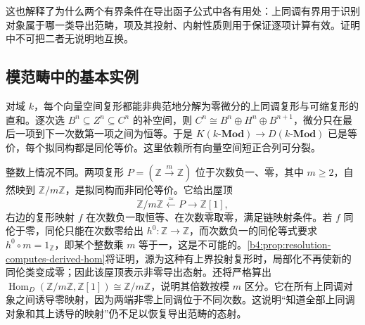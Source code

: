 \ProseParagraphBreak
这也解释了为什么两个有界条件在导出函子公式中各有用处：上同调有界用于识别对象属于哪一类导出范畴，项及其投射、内射性质则用于保证逐项计算有效。证明中不可把二者无说明地互换。

\subsection{模范畴中的基本实例}
\label{b4:subsec:1703:03}

对域 \(k\)，每个向量空间复形都能非典范地分解为零微分的上同调复形与可缩复形的直和。逐次选 \(B^n\subseteq Z^n\subseteq C^n\) 的补空间，则 \(C^n\cong B^n\oplus H^n\oplus B^{n+1}\)，微分只在最后一项到下一次数第一项之间为恒等。于是 \(K(k\text{-}\mathbf{Mod})\to D(k\text{-}\mathbf{Mod})\) 已是等价，每个拟同构都是同伦等价。这里依赖所有向量空间短正合列可分裂。

\ProseParagraphBreak
整数上情况不同。两项复形 \(P=(\mathbb Z\xrightarrow{m}\mathbb Z)\) 位于次数负一、零，其中 \(m\ge2\)，自然映到 \(\mathbb Z/m\mathbb Z\)，是拟同构而非同伦等价。它给出屋顶
\[
	\mathbb Z/m\mathbb Z\xleftarrow{\simeq}P\longrightarrow\mathbb Z[1],
\]
右边的复形映射 \(f\) 在次数负一取恒等、在次数零取零，满足链映射条件。若 \(f\) 同伦于零，同伦只能在次数零给出 \(h^0:\mathbb Z\to\mathbb Z\)，而次数负一的同伦等式要求 \(h^0\circ m=1_{\mathbb Z}\)，即某个整数乘 \(m\) 等于一，这是不可能的。\cref{b4:prop:resolution-computes-derived-hom}将证明，源为这种有上界投射复形时，局部化不再使新的同伦类变成零；因此该屋顶表示非零导出态射。还将严格算出 \(\operatorname{Hom}_D(\mathbb Z/m\mathbb Z,\mathbb Z[1])\cong\mathbb Z/m\mathbb Z\)，说明其倍数按模 \(m\) 区分。它在所有上同调对象之间诱导零映射，因为两端非零上同调位于不同次数。这说明“知道全部上同调对象和其上诱导的映射”仍不足以恢复导出范畴的态射。
